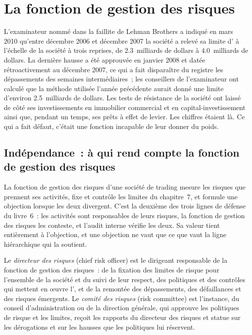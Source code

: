 \chapter{La fonction de gestion des risques}\label{ch:fm:the-risk-management-function}

L'examinateur nommé dans la faillite de Lehman Brothers a indiqué en mars 2010 qu'entre décembre 2006 et décembre 2007 la société a relevé
sa limite d' à l'échelle de la société à trois reprises, de 2.3~milliards de dollars à 4.0~milliards de dollars. La dernière hausse a été approuvée en janvier 2008 et datée rétroactivement au
décembre 2007, ce qui a fait disparaître du registre les dépassements des semaines intermédiaires~; les conseillers de l'examinateur ont calculé que la méthode utilisée
l'année précédente aurait donné une limite d'environ 2.5~milliards de dollars. Les tests de résistance de la société ont laissé de côté ses investissements en immobilier commercial et en capital-investissement
ainsi que, pendant un temps, ses prêts à effet de levier. Les chiffres étaient là. Ce qui a fait défaut, c'était une fonction incapable de leur donner du poids.

\section{Indépendance~: à qui rend compte la fonction de gestion des risques}

La fonction de gestion des risques d'une société de trading mesure les risques que prennent ses activités, fixe et contrôle les limites du chapitre~7, et formule une objection lorsque les deux divergent.
C'est la deuxième des trois lignes de défense du livre~6~: les activités sont responsables de leurs risques, la fonction de gestion des risques les conteste, et l'audit interne vérifie
les deux. Sa valeur tient entièrement à l'objection, et une objection ne vaut que ce que vaut la ligne hiérarchique qui la soutient.

\begin{definition}\label{def:fm:the-risk-management-function:cro}
Le \emph{directeur des risques} (chief risk officer) est le dirigeant responsable de la fonction de gestion des risques~: de la fixation des limites de risque pour l'ensemble de la société
et du suivi de leur respect, des politiques et des contrôles qui mettent en œuvre l', et de la remontée des dépassements, des défaillances
et des risques émergents. Le \emph{comité des risques} (risk committee) est l'instance, du conseil d'administration ou de la direction générale, qui approuve les politiques de risque
et les limites, reçoit les rapports du directeur des risques et statue sur les dérogations et sur les hausses que les politiques lui réservent.
\end{definition}

